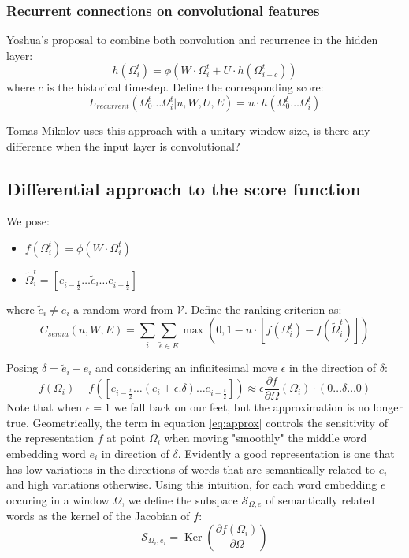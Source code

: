 \documentclass[11pt]{article} %
\begin{document}
\subsubsection{Recurrent connections on convolutional features}
Yoshua's proposal to combine both convolution and recurrence in the hidden layer:
\[\displaystyle h \left(\Omega_i^t \right) = \phi\left( W \cdot \Omega_i^t + U  \cdot h \left(\Omega_{i-c}^{t}\right)\right)\]
where $c$ is the historical timestep. Define the corresponding score:
\[ L_{recurrent} \left(\Omega_0^t \ldots \Omega_{i}^t  | u,W,U,E\right) = u \cdot h \left( \Omega_0^t \ldots \Omega_{i}^t  \right)   \]

Tomas Mikolov uses this approach with a unitary window size, is there any difference when the input layer is convolutional?

\subsection{Differential approach to the score function}

We pose:
\begin{itemize}[-]
\item $f(\Omega_i^t) = \phi \left( W \cdot \Omega_i^t\right)$
\item $\tilde{\Omega}_i^t = \left[e_{i-\frac{t}{2}} \ldots \tilde{e}_{i}  \ldots e_{i+\frac{t}{2}} \right] $
\end{itemize} 
where $\tilde{e}_{i}\neq e_i$ a random word from $\mathcal{V}$. Define the ranking criterion as:
\begin{equation}
\label{eq:senna}
\displaystyle C_{senna}(u,W,E) = \sum_i \sum_{\tilde e \in E} \max \left(0,1 - u \cdot \left[ f\left(\Omega_i^t\right)   - f\left(\tilde{\Omega}_i^t\right)  \right] \right) 
\end{equation}

Posing $\delta = \tilde{e}_i - e_{i}$ and considering an infinitesimal move $\epsilon$ in the direction of $\delta$:
\begin{equation}
\label{eq:approx}
f\left(\Omega_i\right)   - f\left(\left[ e_{i-\frac{t}{2}} \ldots (e_{i} + \epsilon . \delta)  \ldots e_{i+\frac{t}{2}}\right]\right)  \approx \epsilon \frac{\partial f }{\partial  \Omega} \left(\Omega_i\right) \cdot \left( 0\ldots \delta \ldots 0\right)
\end{equation}
Note that when $\epsilon = 1$ we fall back on our feet, but the approximation is no longer true.
Geometrically, the term in equation \ref{eq:approx} controls the sensitivity of the representation $f$ at point $\Omega_i$ when moving "smoothly" the middle word embedding word $e_{i}$ in direction of $\delta$. Evidently a good representation is one that has low variations in the directions of words that are semantically related  to $e_{i}$ and high variations otherwise. Using this intuition, for each word embedding $e$ occuring in a window $\Omega$, we define the subspace $\mathcal{S}_{\Omega,e}$ of semantically related words as the kernel of the Jacobian of $f$:
\begin{equation}
\mathcal{S}_{\Omega_i,e_{i}} = \operatorname{Ker}\left( \frac{\partial f(\Omega_i) }{\partial  \Omega} \right)
\end{equation}
\end{document}
